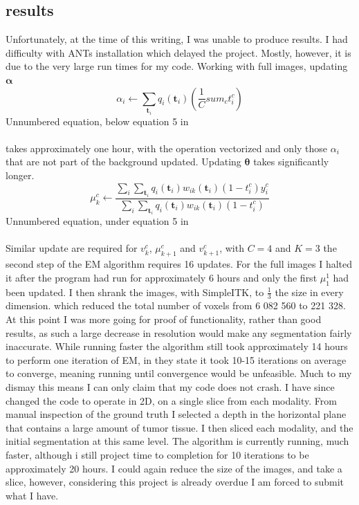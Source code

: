 \documentclass[10pt,twocolumn,letterpaper]{article}
\begin{document}
\subsection{results}
Unfortunately, at the time of this writing, I was unable to produce results. I had difficulty with ANTs installation which delayed the project. Mostly, however, it is due to the very large run times for my code. Working with full images, updating $\boldsymbol{\alpha}$ 
\begin{equation}
\alpha_i \leftarrow \sum_{\boldsymbol{t}_i}q_i(\boldsymbol{t}_i)\left( \frac{1}{C}sum_ct_i^c\right)
\end{equation}
Unnumbered equation, below equation 5 in \cite{Menze2010}
\\\\
takes approximately one hour, with the operation vectorized and only those $\alpha_i$ that are not part of the background updated. Updating $\boldsymbol{\theta}$ takes significantly longer.
\begin{equation}
\mu_k^c \leftarrow \frac{\sum_i\sum_{\boldsymbol{t}_i}q_i(\boldsymbol{t}_i)w_{ik}(\boldsymbol{t}_i)(1-t_i^c)y_i^c}{\sum_i\sum_{\boldsymbol{t}_i}q_i(\boldsymbol{t}_i)w_{ik}(\boldsymbol{t}_i)(1-t_i^c)}
\end{equation}
Unnumbered equation, under equation 5 in \cite{Menze2010}
\\\\
Similar update are required for $v_k^c$, $\mu_{k+1}^c$ and $v_{k+1}^c$, with $C=4$ and $K=3$ the second step of the EM algorithm requires 16 updates. For the full images I halted it after the program had run for approximately 6 hours and only the first $\mu_1^1$ had been updated. I then shrank the images, with SimpleITK, to $\tfrac{1}{3}$ the size in every dimension. which reduced the total number of voxels from 6 082 560 to 221 328. At this point I was more going for proof of functionality, rather than good results, as such a large decrease in resolution would make any segmentation fairly inaccurate. While running faster the algorithm still took approximately 14 hours to perform one iteration of EM, in \cite{Menze2010} they state it took 10-15 iterations on average to converge, meaning running until convergence would be unfeasible. Much to my dismay this means I can only claim that my code does not crash. I have since changed the code to operate in 2D, on a single slice from each modality. From manual  inspection of the ground truth I selected a depth in the horizontal plane that contains a large amount of tumor tissue. I then sliced each modality, and the initial segmentation at this same level. The algorithm is currently running, much faster, although i still project time to completion for 10 iterations to be approximately 20 hours. I could again reduce the size of the images, and take a slice, however, considering this project is already overdue I am forced to submit what I have.
\end{document}
